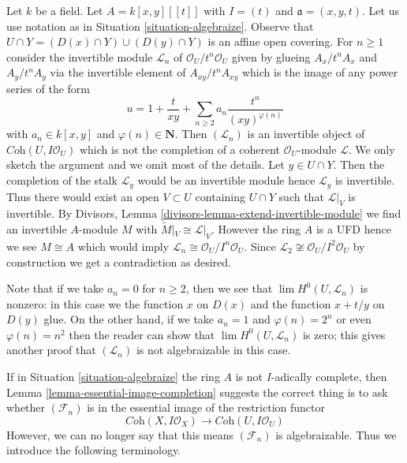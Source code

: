 \begin{example}
\label{example-not-algebraizable}
Let $k$ be a field. Let $A = k[x, y][[t]]$ with $I = (t)$ and
$\mathfrak a = (x, y, t)$. Let us use notation as in
Situation \ref{situation-algebraize}. Observe that
$U \cap Y = (D(x) \cap Y) \cup (D(y) \cap Y)$ is an affine
open covering. For $n \geq 1$ consider the invertible
module $\mathcal{L}_n$ of $\mathcal{O}_U/t^n\mathcal{O}_U$
given by glueing $A_x/t^nA_x$ and $A_y/t^nA_y$ via the invertible
element of $A_{xy}/t^nA_{xy}$ which is the image of any power series
of the form
$$
u = 1 + \frac{t}{xy} + \sum_{n \geq 2} a_n \frac{t^n}{(xy)^{\varphi(n)}}
$$
with $a_n \in k[x, y]$ and $\varphi(n) \in \mathbf{N}$.
Then $(\mathcal{L}_n)$ is an invertible object of
$\textit{Coh}(U, I\mathcal{O}_U)$ which is not the
completion of a coherent $\mathcal{O}_U$-module $\mathcal{L}$.
We only sketch the argument and we omit most of the details.
Let $y \in U \cap Y$. Then the completion of the stalk
$\mathcal{L}_y$ would be an invertible module hence $\mathcal{L}_y$
is invertible. Thus there would exist an open $V \subset U$
containing $U \cap Y$ such that $\mathcal{L}|_V$ is invertible.
By Divisors, Lemma \ref{divisors-lemma-extend-invertible-module}
we find an invertible $A$-module $M$ with
$\widetilde{M}|_V \cong \mathcal{L}|_V$. However the ring $A$
is a UFD hence we see $M \cong A$ which would imply
$\mathcal{L}_n \cong \mathcal{O}_U/I^n\mathcal{O}_U$.
Since $\mathcal{L}_2 \not \cong \mathcal{O}_U/I^2\mathcal{O}_U$
by construction we get a contradiction as desired.

\medskip\noindent
Note that if we take $a_n = 0$ for $n \geq 2$, then we see
that $\lim H^0(U, \mathcal{L}_n)$ is nonzero: in this case
we the function $x$ on $D(x)$ and the function $x + t/y$ on $D(y)$
glue. On the other hand, if we take $a_n = 1$ and $\varphi(n) = 2^n$
or even $\varphi(n) = n^2$ then the reader can show that
$\lim H^0(U, \mathcal{L}_n)$ is zero; this gives another proof
that $(\mathcal{L}_n)$ is not algebraizable in this case.
\end{example}

\noindent
If in Situation \ref{situation-algebraize} the ring $A$ is not
$I$-adically complete, then Lemma \ref{lemma-essential-image-completion}
suggests the correct thing is to ask whether $(\mathcal{F}_n)$
is in the essential image of the restriction functor
$$
\textit{Coh}(X, I\mathcal{O}_X)
\longrightarrow
\textit{Coh}(U, I\mathcal{O}_U)
$$
However, we can no longer say that this means $(\mathcal{F}_n)$
is algebraizable. Thus we introduce the following terminology.

